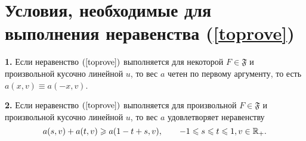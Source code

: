 \section{Условия, необходимые для выполнения неравенства (\ref{toprove})}
\begin{thm}
\label{necessary_conditions_constant}
\textbf{1.}
Если неравенство $(\ref{toprove})$ выполняется для некоторой $F \in \mathfrak{F}$
и произвольной кусочно линейной $u$,
то вес $a$ четен по первому аргументу,
то есть $a(x, v) \equiv a(-x, v)$.

\textbf{2.}
Если неравенство $(\ref{toprove})$ выполняется для произвольной $F \in \mathfrak{F}$
и произвольной кусочно линейной $u$, то вес $a$ удовлетворяет неравенству
\begin{equation}
\label{almostConcave}
a(s, v) + a(t, v) \ge a(1 - t + s, v), \qquad -1 \le s \le t \le 1, v \in \Real_+.
\end{equation}
\end{thm}

